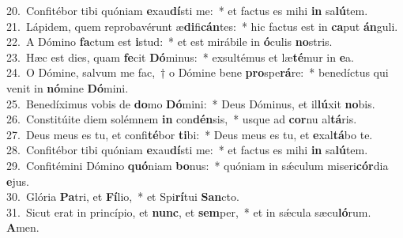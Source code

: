 {20.~}Confitébor tibi quóniam \textbf{e}xau\textbf{dí}sti me:~* et factus es mihi \textbf{in} sa\textbf{lú}tem.\\
{21.~}Lápidem, quem reprobavérunt æ\textbf{di}fi\textbf{cán}tes:~* hic factus est in \textbf{ca}put \textbf{án}guli.\\
{22.~}A Dómino \textbf{fa}ctum est \textbf{i}stud:~* et est mirábile in \textbf{ó}culis \textbf{no}stris.\\
{23.~}Hæc est dies, quam \textbf{fe}cit \textbf{Dó}minus:~* exsultémus et læ\textbf{té}mur in \textbf{e}a.\\
{24.~}O Dómine, salvum me fac,~† o Dómine bene \textbf{pro}spe\textbf{rá}re:~* benedíctus qui venit in \textbf{nó}mine \textbf{Dó}mini.\\
{25.~}Benedíximus vobis de \textbf{do}mo \textbf{Dó}mini:~* Deus Dóminus, et il\textbf{lú}xit \textbf{no}bis.\\
{26.~}Constitúite diem solémnem \textbf{in} con\textbf{dén}sis,~* usque ad \textbf{cor}nu al\textbf{tá}ris.\\
{27.~}Deus meus es tu, et confi\textbf{té}bor \textbf{ti}bi:~* Deus meus es tu, et \textbf{e}xal\textbf{tá}bo te.\\
{28.~}Confitébor tibi quóniam \textbf{e}xau\textbf{dí}sti me:~* et factus es mihi \textbf{in} sa\textbf{lú}tem.\\
{29.~}Confitémini Dómino \textbf{quó}niam \textbf{bo}nus:~* quóniam in sǽculum miseri\textbf{cór}dia \textbf{e}jus.\\
{30.~}Glória \textbf{Pa}tri, et \textbf{Fí}lio,~* et Spi\textbf{rí}tui \textbf{San}cto.\\
{31.~}Sicut erat in princípio, et \textbf{nunc}, et \textbf{sem}per,~* et in sǽcula sæcu\textbf{ló}rum. \textbf{A}men.\\
